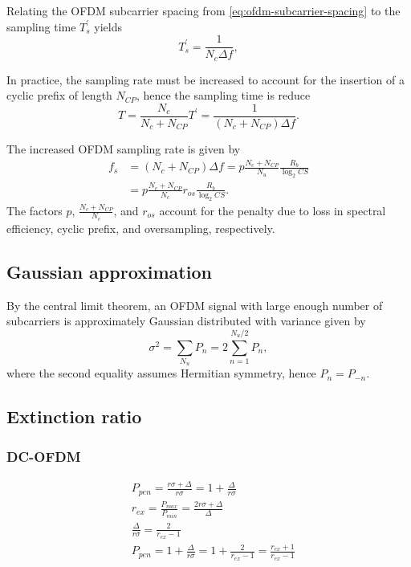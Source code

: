 \documentclass[a4paper]{article}
\begin{document}
Relating the OFDM subcarrier spacing from \eqref{eq:ofdm-subcarrier-spacing} to the sampling time $T_s^{\prime}$ yields
\begin{equation}
T_s^{\prime} = \frac{1}{N_c\Delta f},
\end{equation}

In practice, the sampling rate must be increased to account for the insertion of a cyclic prefix of length $N_{CP}$, hence the sampling time is reduce
\begin{equation}
T = \frac{N_c}{N_c + N_{CP}}T^{\prime} = \frac{1}{(N_c + N_{CP})\Delta f}.
\end{equation}

The increased OFDM sampling rate is given by
\begin{align} \nonumber
f_s &= (N_c + N_{CP})\Delta f = p\frac{N_c + N_{CP}}{N_u}\frac{R_b}{\log_2 CS} \\
&= p\frac{N_c + N_{CP}}{N_c}r_{os}\frac{R_b}{\log_2 CS}.
\end{align}
The factors $p$, $\frac{N_c + N_{CP}}{N_c}$, and $r_{os}$ account for the penalty due to loss in spectral efficiency, cyclic prefix, and oversampling, respectively. 

\subsection{Gaussian approximation}

By the central limit theorem, an OFDM signal with large enough number of subcarriers is approximately Gaussian distributed with variance given by
\begin{equation}
\sigma^2 = \sum_{N_u} P_n = 2\sum_{n=1}^{N_u/2} P_n,
\end{equation}
where the second equality assumes Hermitian symmetry, hence $P_n = P_{-n}$. 

\subsection{Extinction ratio}
\subsubsection{DC-OFDM}
\begin{align} \nonumber
& P_{pen} = \frac{r\sigma + \Delta}{r\sigma} = 1 + \frac{\Delta}{r\sigma} \\
&r_{ex} = \frac{P_{max}}{P_{min}} = \frac{2r\sigma + \Delta}{\Delta} \\ \nonumber
&\frac{\Delta}{r\sigma} = \frac{2}{r_{ex}-1} \\ 
& P_{pen} = 1 + \frac{\Delta}{r\sigma} = 1 + \frac{2}{r_{ex}-1} = \frac{r_{ex}+1}{r_{ex}-1}
\end{align}
\end{document}
